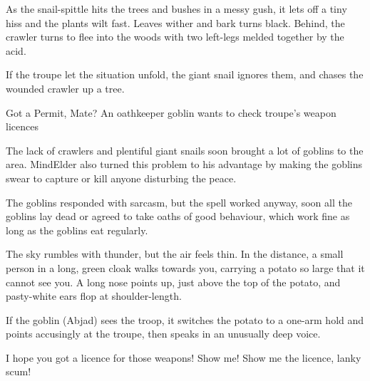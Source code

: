 \begin{multicols}{2}
\begin{boxtext}
  As the snail-spittle hits the trees and bushes in a messy gush, it lets off a tiny hiss and the plants wilt fast.
  Leaves wither and bark turns black.
  Behind, the \gls{crawler} turns to flee into the woods with two left-legs melded together by the acid.
\end{boxtext}

\giantSnail

\chitincrawler

If the troupe let the situation unfold, the giant snail ignores them, and chases the wounded \gls{crawler} up a tree.

{Got a Permit, Mate?}%
{An oathkeeper goblin wants to check troupe's weapon licences}%


\begin{exampletext}
  The lack of \glspl{crawler} and plentiful giant snails soon brought a lot of goblins to the area.
  \Gls{MindElder} also turned this problem to his advantage by making the goblins swear to capture or kill anyone disturbing the peace.

  The goblins responded with sarcasm, but the spell worked anyway, soon all the goblins lay dead or agreed to take oaths of good behaviour, which work fine as long as the goblins eat regularly.
\end{exampletext}

\begin{boxtext}
  The sky rumbles with thunder, but the air feels thin.
  In the distance, a small person in a long, green cloak walks towards you, carrying a potato so large that it cannot see you.
  A long nose points up, just above the top of the potato, and pasty-white ears flop at shoulder-length.
\end{boxtext}

If the goblin (Abjad) sees the troop, it switches the potato to a one-arm hold and points accusingly at the troupe, then speaks in an unusually deep voice.

\null
\begin{speechtext}
  I hope you got a licence for those weapons!
  Show me!
  Show me the licence, lanky scum!
\end{speechtext}


\end{multicols}
